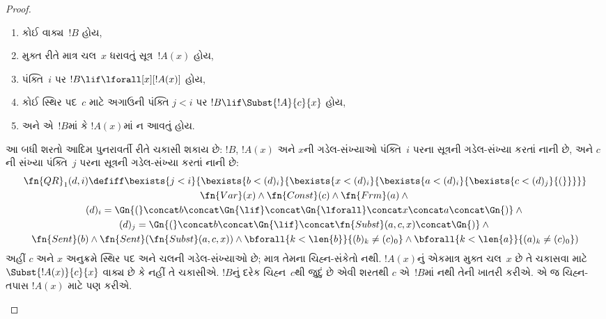 \begin{proof}
\begin{enumerate}
\begin{enumerate}
  \item કોઈ વાક્ય~$!B$ હોય,
  \item મુક્ત રીતે માત્ર ચલ~$x$
    ધરાવતું સૂત્ર~$!A(x)$ હોય,
  \item પંક્તિ~$i$ પર
    $!B \lif \lforall[x][!A(x)]$ હોય,
  \item કોઈ સ્થિર પદ~$c$ માટે અગાઉની
    પંક્તિ $j < i$ પર
    $!B \lif \Subst{!A}{c}{x}$ હોય,
  \item અને એ~$!B$માં કે $!A(x)$માં ન આવતું હોય.
  \end{enumerate}
  આ બધી શરતો આદિમ પુનરાવર્તી રીતે
  ચકાસી શકાય છે: $!B$, $!A(x)$
  અને $x$ની ગડેલ-સંખ્યાઓ પંક્તિ~$i$
  પરના સૂત્રની ગડેલ-સંખ્યા કરતાં
  નાની છે, અને $c$ની સંખ્યા
  પંક્તિ~$j$ પરના સૂત્રની ગડેલ-સંખ્યા
  કરતાં નાની છે:
  \begin{multline*}
    \fn{QR}_1(d, i) \defiff \bexists{j<i}{\bexists{b < (d)_i}{\bexists{x <
        (d)_i}{\bexists{a < (d)_i}{\bexists{c < (d)_j}{(}}}}}
    \\ \fn{Var}(x) \land \fn{Const}(c) \land \fn{Frm}(a) \land {} \\
    (d)_i = \Gn{(} \concat
    b \concat \Gn{\lif} \concat \Gn{\lforall} \concat x \concat a
    \concat \Gn{)} \land {}\\
    (d)_j = \Gn{(} \concat b \concat
    \Gn{\lif} \concat \fn{Subst}(a,c,x) \concat \Gn{)} \land {}\\ \fn{Sent}(b)
    \land \fn{Sent}(\fn{Subst}(a,c,x)) \land {} \bforall{k <
      \len{b}}{(b)_k \neq (c)_0} \land
      \bforall{k < \len{a}}{(a)_k \neq (c)_0})
  \end{multline*}
  અહીં $c$ અને $x$ અનુક્રમે
  સ્થિર પદ અને ચલની ગડેલ-સંખ્યાઓ છે;
  માત્ર તેમના ચિહ્ન-સંકેતો નથી.
  $!A(x)$નું એકમાત્ર મુક્ત ચલ~$x$
  છે તે ચકાસવા માટે
  $\Subst{!A(x)}{c}{x}$
  વાક્ય છે કે નહીં તે ચકાસીએ.
  $!B$નું દરેક ચિહ્ન~$c$થી જુદું છે
  એવી શરતથી $c$ એ~$!B$માં નથી
  તેની ખાતરી કરીએ. એ જ ચિહ્ન-તપાસ $!A(x)$ માટે પણ કરીએ.


\end{enumerate}
\end{proof}
